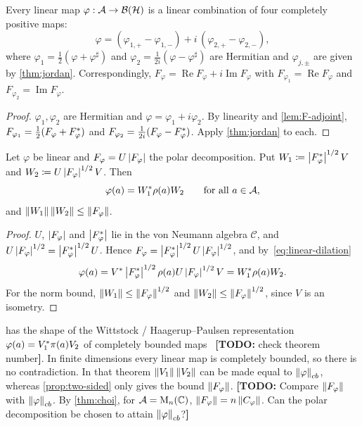 \documentclass[12pt]{article}
\newcommand{\todo}[1]{\textcolor{\mysubcolor}{\small\textbf{[TODO:} #1\textbf{]}}}
\newcommand{\alg}{\mathcal{A}}             %
\newcommand{\hilb}{\mathcal{H}}            %
\newcommand{\bdd}[1]{\mathcal{B}\br{#1}}   %
\newcommand{\Fphi}{F_{\varphi}}            %
\newcommand{\Choi}{C_{\varphi}}            %
\begin{document}
\begin{corollary}
\label{cor:four-cp}
Every linear map \(\varphi : \alg \to \bdd{\hilb}\) is a linear combination of four
completely positive maps:
\[
  \varphi = (\varphi_{1,+} - \varphi_{1,-}) + i\,(\varphi_{2,+} - \varphi_{2,-}),
\]
where \(\varphi_1 = \frac12(\varphi + \varphi^\sharp)\) and
\(\varphi_2 = \frac{1}{2i}(\varphi - \varphi^\sharp)\) are Hermitian and
\(\varphi_{j,\pm}\) are given by \cref{thm:jordan}. Correspondingly,
\(\Fphi = \operatorname{Re}\Fphi + i\operatorname{Im}\Fphi\) with
\(F_{\varphi_1} = \operatorname{Re}\Fphi\) and \(F_{\varphi_2} = \operatorname{Im}\Fphi\).
\end{corollary}
\begin{proof}
\(\varphi_1, \varphi_2\) are Hermitian and \(\varphi = \varphi_1 + i\varphi_2\). By
linearity and \cref{lem:F-adjoint},
\(F_{\varphi_1} = \frac12(\Fphi + \Fphi^\adjoint)\) and
\(F_{\varphi_2} = \frac{1}{2i}(\Fphi - \Fphi^\adjoint)\). Apply \cref{thm:jordan} to each.
\end{proof}

\begin{proposition}
\label{prop:two-sided}
Let \(\varphi\) be linear and \(\Fphi = U\abs{\Fphi}\) the polar decomposition.
Put \(W_1 \eqdef \abs{\Fphi^\adjoint}^{1/2} V\) and \(W_2 \eqdef U\abs{\Fphi}^{1/2} V\).
Then
\[
  \varphi(a) = W_1^\adjoint \rho(a) W_2 \qquad \text{for all } a \in \alg,
\]
and \(\norm{W_1}\norm{W_2} \le \norm{\Fphi}\).
\end{proposition}
\begin{proof}
\(U\), \(\abs{\Fphi}\) and \(\abs{\Fphi^\adjoint}\) lie in the von Neumann algebra
\(\mathcal{C}\), and \(U\abs{\Fphi}^{1/2} = \abs{\Fphi^\adjoint}^{1/2} U\). Hence
\(\Fphi = \abs{\Fphi^\adjoint}^{1/2} U \abs{\Fphi}^{1/2}\), and
by~\eqref{eq:linear-dilation}
\[
  \varphi(a) = V^\adjoint \abs{\Fphi^\adjoint}^{1/2}\rho(a) U \abs{\Fphi}^{1/2} V
  = W_1^\adjoint \rho(a) W_2 .
\]
For the norm bound, \(\norm{W_1} \le \norm{\Fphi}^{1/2}\) and
\(\norm{W_2} \le \norm{\Fphi}^{1/2}\), since \(V\) is an isometry.
\end{proof}

\begin{remark}
 has the shape of the Wittstock / Haagerup--Paulsen
representation \(\varphi(a) = V_1^* \pi(a) V_2\) of completely bounded
maps~\cite[Theorem~8.4]{Paulsen2002} \todo{check theorem number}. In finite dimensions every linear map is
completely bounded, so there is no contradiction. In that theorem
\(\left\| V_1 \right\|\left\| V_2 \right\|\) can be made equal to \(\left\| \varphi \right\|_{cb}\), whereas
\cref{prop:two-sided} only gives the bound \(\norm{\Fphi}\).
\todo{Compare \(\norm{\Fphi}\) with \(\left\| \varphi \right\|_{cb}\). By
\cref{thm:choi}, for \(\alg = \mathrm{M}_n(\complex)\),
\(\norm{\Fphi} = n\norm{\Choi}\). Can the polar decomposition be chosen to attain
\(\left\| \varphi \right\|_{cb}\)?}
\end{remark}
\end{document}
